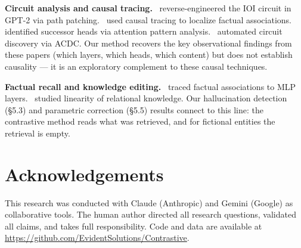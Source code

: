 \documentclass[11pt]{article}
\begin{document}
\textbf{Circuit analysis and causal tracing.}~\citet{wang2023} reverse-engineered
the IOI circuit in GPT-2 via path patching.~\citet{meng2022} used causal
tracing to localize factual associations.~\citet{gould2024} identified
successor heads via attention pattern analysis.~\citet{conmy2023} automated
circuit discovery via ACDC. Our method recovers the key observational findings
from these papers (which layers, which heads, which content) but does not
establish causality --- it is an exploratory complement to these causal
techniques.

\textbf{Factual recall and knowledge editing.}~\citet{geva2023} traced factual
associations to MLP layers.~\citet{hernandez2024} studied linearity of
relational knowledge. Our hallucination detection (\S5.3) and parametric
correction (\S5.5) results connect to this line: the contrastive method
reads what was retrieved, and for fictional entities the retrieval is empty.

\section*{Acknowledgements}

This research was conducted with Claude (Anthropic) and Gemini (Google) as
collaborative tools. The human author directed all research questions,
validated all claims, and takes full responsibility. Code and data are available at \url{https://github.com/EvidentSolutions/Contrastive}.



\end{document}
